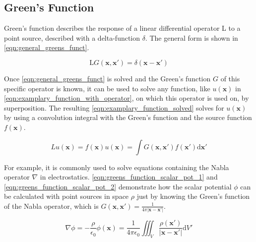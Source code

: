 \subsection{Green's Function}

Green's function describes the response of a linear differential operator L to a point source, described with a delta-function $\delta$. The general form is shown in \autoref{eqn:general_greens_funct}. 

\begin{equation}
    \mathrm{L}G(\mathbf{x},\mathbf{x'}) = \delta(\mathbf{x}-\mathbf{x'})
    \label{eqn:general_greens_funct}
\end{equation}

Once \autoref{eqn:general_greens_funct} is solved and the Green's function $G$ of this specific operator is known, it can be used to solve any function, like $u(\mathbf{x})$ in \autoref{eqn:examplary_function_with_operator}, on which this operator is used on, by superposition. The resulting \autoref{eqn:examplary_function_solved} solves for $u(\mathbf{x})$ by using a convolution integral with the Green's function and the source function $f(\mathbf{x})$.

\begin{subequations}
\begin{equation}
    Lu(\mathbf{x}) = f(\mathbf{x})
    \label{eqn:examplary_function_with_operator}
\end{equation}

\begin{equation}
    u(\mathbf{x})=\int G(\mathbf{x},\mathbf{x'})f(\mathbf{x'})\mathrm{d}\mathbf{x'}
    \label{eqn:examplary_function_solved}
\end{equation}
\end{subequations}

For example, it is commonly used to solve equations containing the Nabla operator $\nabla$ in electrostatics. \autoref{eqn:greens_function_scalar_pot_1} and \autoref{eqn:greens_function_scalar_pot_2} demonstrate how the scalar potential $\phi$ can be calculated with point sources in space $\rho$ just by knowing the Green's function of the Nabla operator, which is $G(\mathbf{x},\mathbf{x'}) = \frac{1}{4\pi |\mathbf{x}-\mathbf{x'|}}$.

\begin{subequations}
\begin{equation}
    \nabla \phi = -\frac{\rho}{\epsilon_0}
    \label{eqn:greens_function_scalar_pot_1}
\end{equation}
\begin{equation}
    \phi(\mathbf{x}) = \frac{1}{4\pi\epsilon_0}\iiint_V\frac{\rho(\mathbf{x'})}{|\mathbf{x}-\mathbf{x'}|}\mathrm{d}V'
    \label{eqn:greens_function_scalar_pot_2}
\end{equation}
\end{subequations}

